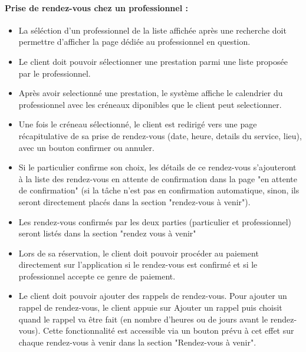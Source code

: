 \documentclass{article}
\begin{document}
\paragraph{Prise de rendez-vous chez un professionnel :}
\begin{itemize}

\item La séléction d'un
  professionnel de la liste affichée après une recherche doit permettre d'afficher la
  page dédiée au professionnel en question.
\item Le client doit pouvoir sélectionner une prestation parmi une liste
  proposée par le professionnel.
\item Après avoir selectionné une prestation, le système affiche le
  calendrier du professionnel avec les créneaux diponibles que le
  client peut selectionner.
\item Une fois le créneau sélectionné, le client est redirigé vers
    une page récapitulative de sa prise de rendez-vous (date, heure, details du service, lieu), avec un bouton
    confirmer ou annuler.
\item Si le particulier confirme son choix, les détails de ce rendez-vous s'ajouteront à la liste des rendez-vous 
en attente de confirmation dans la page "en attente de confirmation"
(si la tâche n'est pas en confirmation automatique, sinon, ils seront directement placés dans la section "rendez-vous à venir").
\item Les rendez-vous confirmés par les deux parties (particulier et professionnel) seront listés dans la section "rendez vous à venir"
\item Lors de sa réservation, le client doit pouvoir procéder au
  paiement directement sur l'application si le rendez-vous est confirmé et si le professionnel accepte ce genre de paiement.
\item Le client doit pouvoir ajouter des
  rappels de rendez-vous. Pour ajouter un rappel de rendez-vous, le
  client appuie sur \og Ajouter un rappel \fg{} puis choisit quand le
  rappel va être fait (en nombre d'heures ou de jours avant le
  rendez-vous). Cette fonctionnalité est accessible via un bouton
  prévu à cet effet sur chaque rendez-vous à venir dans la section "Rendez-vous à venir".



\end{itemize}
\end{document}
